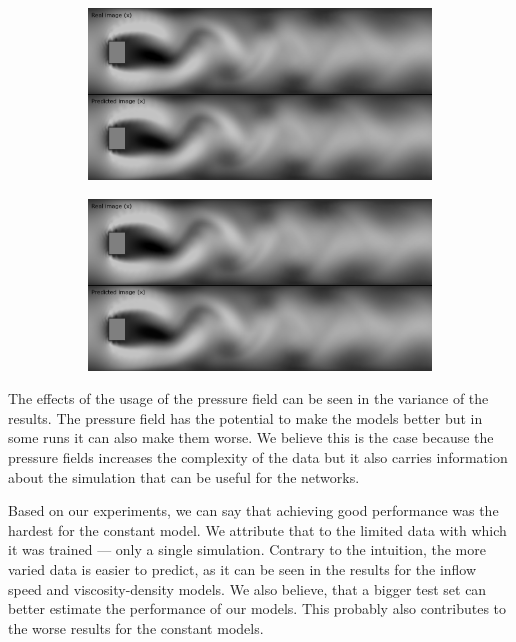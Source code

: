 \documentclass{llncs}
\begin{document}
\begin{figure}
  \begin{subfigure}{.5\textwidth}
    \centering
    \includegraphics[width=1\linewidth]{imgs/pred}
  \end{subfigure}
  \begin{subfigure}{.5\textwidth}
    \centering
    \includegraphics[width=1\linewidth]{imgs/pred.png}  
  \end{subfigure}
\end{figure}

The effects of the usage of the pressure field can be seen in the variance of the results. The pressure field has the potential to make the models better but in some runs it can also make them worse. We believe this is the case because the pressure fields increases the complexity of the data but it also carries information about the simulation that can be useful for the networks.

Based on our experiments, we can say that achieving good performance was the hardest for the constant model. We attribute that to the limited data with which it was trained --- only a single simulation. Contrary to the intuition, the more varied data is easier to predict, as it can be seen in the results for the inflow speed and viscosity-density models. We also believe, that a bigger test set can better estimate the performance of our models. This probably also contributes to the worse results for the constant models.
\end{document}
